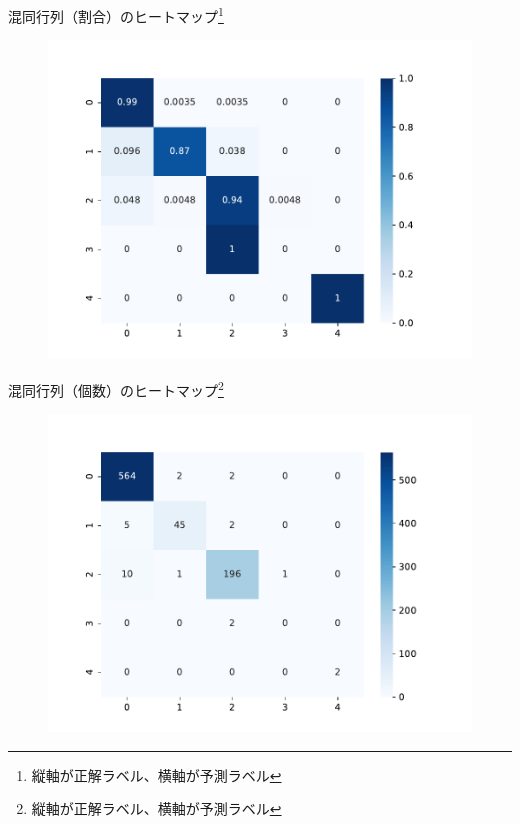 \documentclass{beamer}
\begin{document}
  \begin{frame}{混同行列（割合）のヒートマップ\footnote{縦軸が正解ラベル、横軸が予測ラベル}}
    \begin{figure}
      \centering
      \includegraphics[keepaspectratio, scale=0.6]{images/deep_conv_heatmap.pdf}
      \label{fig:heatmap_ratio}
    \end{figure}
  \end{frame}

  \begin{frame}{混同行列（個数）のヒートマップ\footnote{縦軸が正解ラベル、横軸が予測ラベル}}
    \begin{figure}
      \centering
      \includegraphics[keepaspectratio, scale=0.6]{images/deep_conv_cnt_heatmap.pdf}
      \label{fig:heatmap_cnt}
    \end{figure}
  \end{frame}
\end{document}
